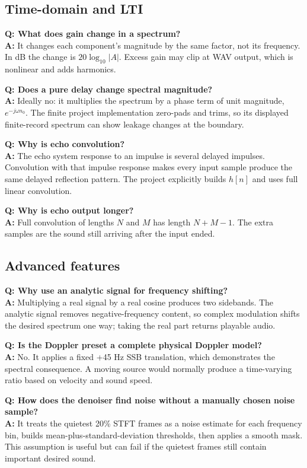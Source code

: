 \documentclass[11pt,a4paper]{article}
\begin{document}
\subsection*{Time-domain and LTI}
\textbf{Q: What does gain change in a spectrum?}\\
\textbf{A:} It changes each component's magnitude by the same factor, not its frequency. In dB the change is \(20\log_{10}|A|\). Excess gain may clip at WAV output, which is nonlinear and adds harmonics.

\textbf{Q: Does a pure delay change spectral magnitude?}\\
\textbf{A:} Ideally no: it multiplies the spectrum by a phase term of unit magnitude, \(e^{-j\omega n_0}\). The finite project implementation zero-pads and trims, so its displayed finite-record spectrum can show leakage changes at the boundary.

\textbf{Q: Why is echo convolution?}\\
\textbf{A:} The echo system response to an impulse is several delayed impulses. Convolution with that impulse response makes every input sample produce the same delayed reflection pattern. The project explicitly builds \(h[n]\) and uses full linear convolution.

\textbf{Q: Why is echo output longer?}\\
\textbf{A:} Full convolution of lengths \(N\) and \(M\) has length \(N+M-1\). The extra samples are the sound still arriving after the input ended.

\subsection*{Advanced features}
\textbf{Q: Why use an analytic signal for frequency shifting?}\\
\textbf{A:} Multiplying a real signal by a real cosine produces two sidebands. The analytic signal removes negative-frequency content, so complex modulation shifts the desired spectrum one way; taking the real part returns playable audio.

\textbf{Q: Is the Doppler preset a complete physical Doppler model?}\\
\textbf{A:} No. It applies a fixed +45 Hz SSB translation, which demonstrates the spectral consequence. A moving source would normally produce a time-varying ratio based on velocity and sound speed.

\textbf{Q: How does the denoiser find noise without a manually chosen noise sample?}\\
\textbf{A:} It treats the quietest 20\% STFT frames as a noise estimate for each frequency bin, builds mean-plus-standard-deviation thresholds, then applies a smooth mask. This assumption is useful but can fail if the quietest frames still contain important desired sound.
\end{document}
